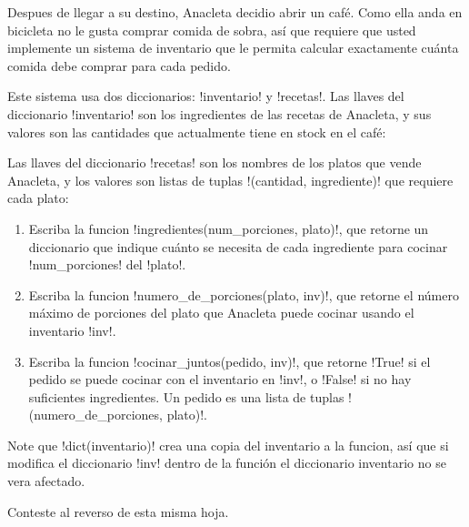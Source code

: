 Despues de llegar a su destino,
Anacleta decidio abrir un café.
Como ella anda en bicicleta
no le gusta comprar comida de sobra,
así que requiere que usted implemente un sistema de inventario
que le permita calcular exactamente
cuánta comida debe comprar para cada pedido.

Este sistema usa dos diccionarios: \li!inventario! y \li!recetas!.
Las llaves del diccionario \li!inventario!
son los ingredientes de las recetas de Anacleta,
y sus valores son las cantidades que actualmente tiene en stock en el café:


Las llaves del diccionario \li!recetas!
son los nombres de los platos que vende Anacleta,
y los valores son listas de tuplas \li!(cantidad, ingrediente)!
que requiere cada plato:


\begin{enumerate}[leftmargin=0pt,label=\emph{\alph*})]

  \item
    Escriba la funcion \li!ingredientes(num_porciones, plato)!,
    que retorne un diccionario que indique
    cuánto se necesita de cada ingrediente
    para cocinar \li!num_porciones! del \li!plato!.
    

  \item
    Escriba la funcion \li!numero_de_porciones(plato, inv)!,
    que retorne el número máximo de porciones del plato
    que Anacleta puede cocinar usando el inventario \li!inv!.
    

  \item
    Escriba la funcion \li!cocinar_juntos(pedido, inv)!,
    que retorne \li!True! si el pedido se puede cocinar
    con el inventario en \li!inv!,
    o \li!False! si no hay suficientes ingredientes.
    Un pedido es una lista de tuplas \li!(numero_de_porciones, plato)!.
    

\end{enumerate}

Note que \li!dict(inventario)! crea
una copia del inventario a la funcion,
así que si modifica el diccionario \li!inv! dentro de la función
el diccionario inventario no se vera afectado.

Conteste al reverso de esta misma hoja.

